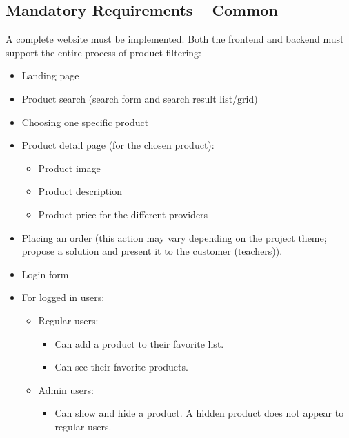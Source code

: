 \subsection{Mandatory Requirements – Common}
A complete website must be implemented. Both the frontend and backend must support the entire process of product filtering:
\begin{itemize}
    \item Landing page
    \item Product search (search form and search result list/grid)
    \item Choosing one specific product
    \item Product detail page (for the chosen product):
    \begin{itemize}
        \item Product image
        \item Product description
        \item Product price for the different providers
    \end{itemize}
    \item Placing an order (this action may vary depending on the project theme; propose a solution and present it to the customer (teachers)).
    \item Login form
    \item For logged in users:
    \begin{itemize}
        \item Regular users:
        \begin{itemize}
            \item Can add a product to their favorite list.
            \item Can see their favorite products.
        \end{itemize}
        \item Admin users:
        \begin{itemize}
            \item Can show and hide a product. A hidden product does not appear to regular users.
        \end{itemize}
    \end{itemize}
\end{itemize}